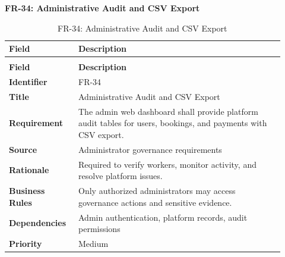 \documentclass[12pt,a4paper]{article}
\begin{document}
\noindent\textbf{FR-34: Administrative Audit and CSV Export}\par
\vspace{4pt}
\begingroup\small\setlength{\tabcolsep}{4pt}\renewcommand{\arraystretch}{1.15}
\begin{longtable}{|>{\raggedright\arraybackslash}p{0.22\linewidth}|>{\raggedright\arraybackslash}p{0.70\linewidth}|}
\caption{FR-34: Administrative Audit and CSV Export}\label{tab:fr-34}\\
\hline
\textbf{Field} & \textbf{Description} \\ \hline
\endfirsthead
\multicolumn{2}{c}{Table \thetable\ Administrative Audit and CSV Export (continued)}\\
\hline
\textbf{Field} & \textbf{Description} \\ \hline
\endhead
\textbf{Identifier} & FR-34 \\ \hline
\textbf{Title} & Administrative Audit and CSV Export \\ \hline
\textbf{Requirement} & The admin web dashboard shall provide platform audit tables for users, bookings, and payments with CSV export. \\ \hline
\textbf{Source} & Administrator governance requirements \\ \hline
\textbf{Rationale} & Required to verify workers, monitor activity, and resolve platform issues. \\ \hline
\textbf{Business Rules} & Only authorized administrators may access governance actions and sensitive evidence. \\ \hline
\textbf{Dependencies} & Admin authentication, platform records, audit permissions \\ \hline
\textbf{Priority} & Medium \\ \hline
\end{longtable}
\endgroup
\clearpage
\end{document}
